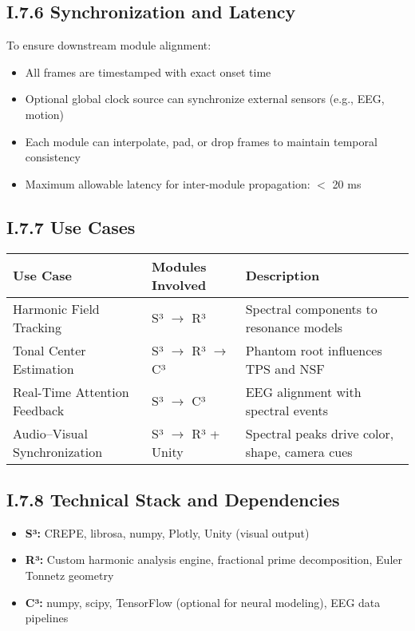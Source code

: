 \subsection*{I.7.6 Synchronization and Latency}

To ensure downstream module alignment:

\begin{itemize}
    \item All frames are timestamped with exact onset time
    \item Optional global clock source can synchronize external sensors (e.g., EEG, motion)
    \item Each module can interpolate, pad, or drop frames to maintain temporal consistency
    \item Maximum allowable latency for inter-module propagation: $<$ 20 ms
\end{itemize}

\subsection*{I.7.7 Use Cases}

\begin{center}
\begin{tabular}{|l|l|p{8cm}|}
\hline
\textbf{Use Case} & \textbf{Modules Involved} & \textbf{Description} \\
\hline
Harmonic Field Tracking & S³ $\rightarrow$ R³ & Spectral components to resonance models \\
Tonal Center Estimation & S³ $\rightarrow$ R³ $\rightarrow$ C³ & Phantom root influences TPS and NSF \\
Real-Time Attention Feedback & S³ $\rightarrow$ C³ & EEG alignment with spectral events \\
Audio–Visual Synchronization & S³ $\rightarrow$ R³ + Unity & Spectral peaks drive color, shape, camera cues \\
\hline
\end{tabular}
\end{center}

\subsection*{I.7.8 Technical Stack and Dependencies}

\begin{itemize}
    \item \textbf{S³:} CREPE, librosa, numpy, Plotly, Unity (visual output)
    \item \textbf{R³:} Custom harmonic analysis engine, fractional prime decomposition, Euler Tonnetz geometry
    \item \textbf{C³:} numpy, scipy, TensorFlow (optional for neural modeling), EEG data pipelines
\end{itemize}

